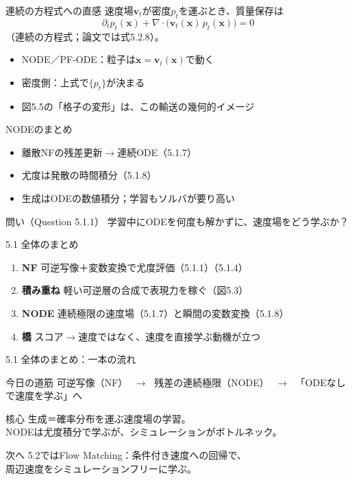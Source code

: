 \asmain
\begin{frame}{連続の方程式への直感}
    速度場$\bm{v}_t$が密度$p_t$を運ぶとき、質量保存は
    \[
        \partial_t p_t(\bm{x})
        +
        \nabla\cdot\bigl(\bm{v}_t(\bm{x})\,p_t(\bm{x})\bigr)
        =
        0
    \]
    （連続の方程式；論文では式5.2.8）。
    \begin{itemize}
        \item NODE／PF-ODE：粒子は$\dot{\bm{x}}=\bm{v}_t(\bm{x})$で動く
        \item 密度側：上式で$\{p_t\}$が決まる
        \item 図5.5の「格子の変形」は、この輸送の幾何的イメージ
    \end{itemize}
\end{frame}
\asmain
\begin{frame}{NODEのまとめ}
    \begin{itemize}
        \item 離散NFの残差更新$\to$連続ODE（5.1.7）
        \item 尤度は発散の時間積分（5.1.8）
        \item 生成はODEの数値積分；学習もソルバが要り高い
    \end{itemize}
    \begin{block}{問い（Question 5.1.1）}
        学習中にODEを何度も解かずに、速度場をどう学ぶか？
    \end{block}
\end{frame}
\asmain
\begin{frame}{5.1 全体のまとめ}
    \begin{enumerate}
        \item \textbf{NF}
        可逆写像＋変数変換で尤度評価（5.1.1）（5.1.4）
        \item \textbf{積み重ね}
        軽い可逆層の合成で表現力を稼ぐ（図5.3）
        \item \textbf{NODE}
        連続極限の速度場（5.1.7）と瞬間の変数変換（5.1.8）
        \item \textbf{橋}
        スコア$\to$速度ではなく、速度を直接学ぶ動機が立つ
    \end{enumerate}
\end{frame}
\asmain
\begin{frame}{5.1 全体のまとめ：一本の流れ}
    \begin{block}{今日の道筋}
        可逆写像（NF）
        $\;\to\;$
        残差の連続極限（NODE）
        $\;\to\;$
        「ODEなしで速度を学ぶ」へ
    \end{block}
    \begin{block}{核心}
        生成＝確率分布を運ぶ速度場の学習。\\
        NODEは尤度積分で学ぶが、シミュレーションがボトルネック。
    \end{block}
    \begin{block}{次へ}
        5.2ではFlow Matching：条件付き速度への回帰で、\\
        周辺速度をシミュレーションフリーに学ぶ。
    \end{block}
\end{frame}
